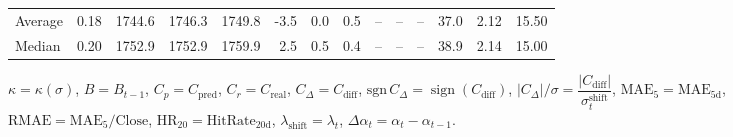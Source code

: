 \begin{threeparttable}
{\begin{tabular}{lrrrrrrrrrrrrr}
Average &     0.18 & 1744.6 & 1746.3 & 1749.8 &       -3.5 &                      0.0 &                 0.5 &         -- &        -- &             -- &             37.0 &            2.12 &                  15.50 \\
 Median &     0.20 & 1752.9 & 1752.9 & 1759.9 &        2.5 &                      0.5 &                 0.4 &         -- &        -- &             -- &             38.9 &            2.14 &                  15.00 \\
\bottomrule
\end{tabular}
}
\begin{tablenotes}\footnotesize
\item $\kappa=\kappa(\sigma)$, $B=B_{t-1}$, $C_p=C_{\text{pred}}$, $C_r=C_{\text{real}}$, $C_\Delta=C_{\text{diff}}$, $\mathrm{sgn}\,C_\Delta=\operatorname{sign}(C_{\text{diff}})$, $|C_\Delta|/\sigma=\dfrac{|C_{\text{diff}}|}{\sigma_t^{\text{shift}}}$, $\mathrm{MAE}_5=\mathrm{MAE}_{5\text{d}}$, $\mathrm{RMAE}= \mathrm{MAE}_5 / \text{Close}$, $\mathrm{HR}_{20}=\mathrm{HitRate}_{20\text{d}}$, 
$\lambda_{\text{shift}}=\lambda_t$, 
$\Delta\alpha_t=\alpha_t-\alpha_{t-1}$.
\end{tablenotes}
\end{threeparttable}
\endgroup

